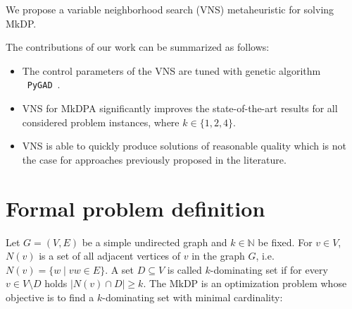 \documentclass[dvipsnames,format=sigconf,anonymous=true,review=true]{acmart}
\begin{document}
We propose a variable neighborhood search (VNS) metaheuristic for solving MkDP. 
\begin{comment}
The main algorithm components of this algorithm are:
\begin{itemize}
	\item A carefully designed fitness function that evaluates solutions  including also unfeasible ones; it takes into consideration two scores ($i$) the size of dominating set and ($ii$) a measure of penalization that evaluates how far is the considered set from being a $k$--dominating. 
	\item A shaking procedure that systematically destructs feasible solutions and ensures escaping the algorithm from a local optima. It is based on swap operations. 
	\item An efficient swap--based  best-improvement local search mechanism   has been applied. It is equipped with an quick partial evaluation of the fitness function, executed in linear time.
\end{itemize}
\end{comment}
The contributions of our work can be summarized as follows:
\begin{itemize}
	
	\item The control parameters of the VNS are tuned with genetic algorithm ~\texttt{PyGAD}~\cite{gad2021pygad}.  
	
	\item VNS for MkDPA significantly improves the state-of-the-art results for all considered problem instances, where $k \in \{1, 2, 4\}$.
	
	\item VNS is able to quickly produce solutions of reasonable quality which is not the case for approaches previously proposed in the literature.
	
\end{itemize}

\section{Formal problem definition }
    
Let $G=(V,E)$ be a simple undirected graph and $k \in \mathbb{N}$ be fixed. For $v\in V$, $N(v)$ is a set of all adjacent vertices of $v$ in the graph $G$, i.e. $N(v)=\{w \mid vw \in E\}$. A set $D \subseteq V$ is called $k$-dominating set if for every $v\in V \setminus D$ holds $|N(v) \cap D| \geq k$. The MkDP is an optimization problem whose objective is to find a $k$-dominating set with minimal cardinality:
\end{document}
